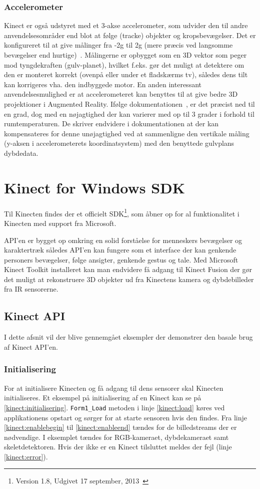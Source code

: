 \subsubsection{Accelerometer}
Kinect er også udstyret med et 3-akse accelerometer, som udvider den til andre anvendelsesområder end blot at følge (tracke) objekter og kropsbevægelser.
Det er konfigureret til at give målinger fra -2g til 2g (mere præcis ved langsomme bevægelser end hurtige)~\cite{kinectAccelerometer}.
Målingerne  er opbygget som en 3D vektor som peger mod tyngdekraften (gulv-planet), hvilket f.eks. gør det muligt at detektere om den er monteret korrekt (ovenpå eller under et fladskærms tv), således dens tilt kan korrigeres vha. den indbyggede motor.
En anden interessant anvendelsesmulighed er at accelerometeret kan benyttes til at give bedre 3D projektioner i Augmented Reality.
Ifølge dokumentationen~\cite{kinectDocAccelerometer}, er det præcist ned til en grad, dog med en nøjagtighed der kan varierer med op til 3 grader i forhold til rumtemperaturen.
De skriver endvidere i dokumentationen at der kan kompensateres for denne unøjagtighed ved at sammenligne den vertikale måling (y-aksen i accelerometerets koordinatsystem) med den benyttede gulvplans dybdedata.


\section{Kinect for Windows SDK}
Til Kinecten findes der et officielt SDK\footnote{ Version 1.8, Udgivet 17 september, 2013~\cite{kinectSDK18}}, som åbner op for al funktionalitet i Kinecten med support fra Microsoft.

API'en er bygget op omkring en solid forståelse for menneskers bevægelser og karaktertræk således API'en kan fungere som et interface der kan genkende personers bevægelser, følge ansigter, genkende gestus og tale.
Med Microsoft Kinect Toolkit installeret kan man endvidere få adgang til Kinect Fusion der gør det muligt at rekonstruere 3D objekter ud fra Kinectens kamera og dybdebilleder fra IR sensorerne.~\cite{kinectForWindowsFeatures}


\subsection{Kinect API}\label{kinect:kinectapi}
I dette afsnit vil der blive gennemgået eksempler der demonstrer den basale brug af Kinect API'en.

\subsubsection{Initialisering}
For at initialisere Kinecten og få adgang til dens sensorer skal Kinecten initialiseres.
Et eksempel på initialisering af en Kinect kan se på \cref{kinect:initialisering}. \lstinline[style=csharp]|Form1_Load| metoden i linje \ref{kinect:load} køres ved applikationens opstart og sørger for at starte sensoren hvis den findes. Fra linje \ref{kinect:enablebegin} til \ref{kinect:enableend} tændes for de billedstreams der er nødvendige. I eksemplet tændes for RGB-kameraet, dybdekameraet samt skeletdetektoren. Hvis der ikke er en Kinect tilsluttet meldes der fejl (linje \ref{kinect:error}).


